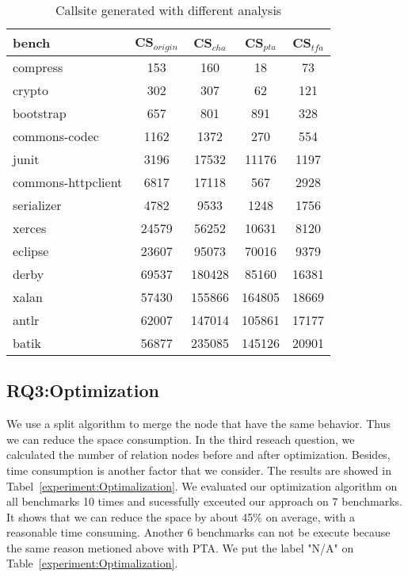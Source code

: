 \documentclass{llncs}
\begin{document}
\begin{table}[!htbp]\centering
\caption{Callsite generated with different analysis}
\begin{tabular}{lcccc}
	\hline
	\textbf{bench} & \textbf{CS$_{origin}$} & \textbf{CS$_{cha}$} & \textbf{CS$_{pta}$} & \textbf{CS$_{tfa}$} \\
	\hline
	compress & 153 & 160 & 18 & 73 \\
	crypto & 302 & 307 & 62 & 121 \\
	bootstrap & 657 & 801 & 891 & 328 \\
	commons-codec & 1162 & 1372 & 270 & 554 \\
	junit & 3196 & 17532 & 11176 & 1197 \\
	commons-httpclient & 6817 & 17118 & 567 & 2928 \\
	serializer & 4782 & 9533 & 1248 & 1756 \\
	xerces & 24579 & 56252 & 10631 & 8120 \\
	eclipse & 23607 & 95073 & 70016 & 9379 \\
	derby & 69537 & 180428 & 85160 & 16381 \\
	xalan & 57430 & 155866 & 164805 & 18669 \\
	antlr & 62007 & 147014 & 105861 & 17177 \\
	batik & 56877 & 235085 & 145126 & 20901 \\
	\hline
\end{tabular}
\label{experiment:Callsite}
\end{table}

\subsection{RQ3:Optimization}\label{subsec:optimization}
We use a split algorithm to merge the node that have the same behavior. Thus we can reduce the space consumption. In the third reseach question, we calculated the number of relation nodes before and after optimization. Besides, time consumption is another factor that we consider. The results are showed in Tabel~\ref{experiment:Optimalization}. We evaluated our optimization algorithm on all benchmarks 10 times and sucessfully exceuted our approach on 7 benchmarks. It shows that we can reduce the space by about 45$\%$ on average, with a reasonable time consuming. Another 6 benchmarks can not be execute because the same reason metioned above with PTA. We put the label "N/A" on Table~\ref{experiment:Optimalization}.  
\end{document}
